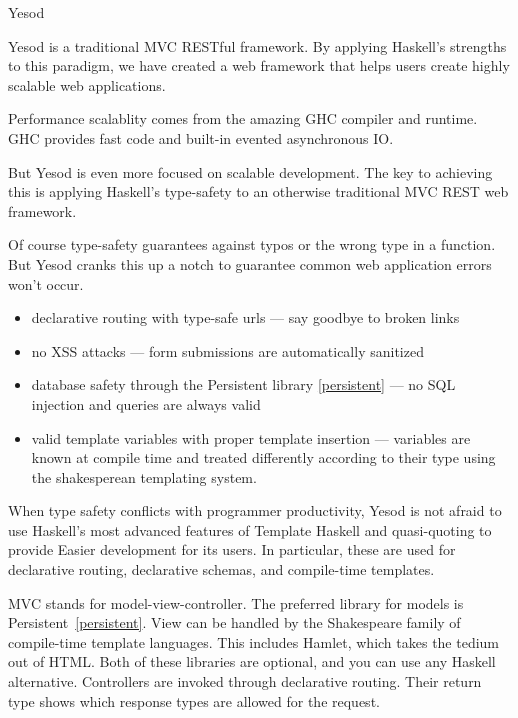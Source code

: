 \begin{hcarentry}{Yesod} 
\label{yesod}
\makeheader

Yesod is a traditional MVC RESTful framework. By applying Haskell's strengths to this paradigm, we have created a web framework that helps users create highly scalable web applications.

Performance scalablity comes from the amazing GHC compiler and runtime. GHC provides fast code and built-in evented asynchronous IO.

But Yesod is even more focused on scalable development. The key to achieving this is applying Haskell's type-safety to an otherwise traditional MVC REST web framework.

Of course type-safety guarantees against typos or the wrong type in a function. But Yesod cranks this up a notch to guarantee common web application errors won't occur.
\begin{itemize}
\item declarative routing with type-safe urls --- say goodbye to broken links
\item no XSS attacks --- form submissions are automatically sanitized
\item database safety through the Persistent library \cref{persistent} --- no SQL injection and queries are always valid
\item valid template variables with proper template insertion --- variables are known at compile time and treated differently according to their type using the shakesperean templating system.
\end{itemize}

When type safety conflicts with programmer productivity,
Yesod is not afraid to use Haskell's most advanced features
of Template Haskell and quasi-quoting to provide
Easier development for its users. In particular, these are used for
declarative routing, declarative schemas, and compile-time templates.

MVC stands for model-view-controller. The preferred library for models
is Persistent~\cref{persistent}.  View can be handled by the Shakespeare family of compile-time template languages. This includes Hamlet, which takes the tedium out of HTML. Both of these libraries are optional, and you can use any Haskell alternative. Controllers are invoked through declarative routing. Their return type shows which response types are allowed for the request.


\end{hcarentry}

